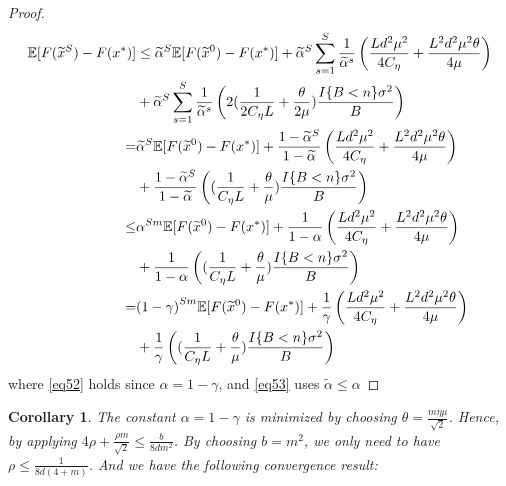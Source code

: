 \documentclass{article}
\newcommand*{\E}{\mathbb{E}}
\newtheorem{corollary}[theorem]{Corollary}
\theoremstyle{definition}
\theoremstyle{remark}
\begin{document}
{\begin{proof}
{\color{blue}
\begin{align}
\E[F(\widetilde{x}^S) - F(x^*)] & \leq \widetilde{\alpha}^{S} \E[F(\widetilde{x}^0) - F({x}^*)] +\widetilde{\alpha}^{S} \sum_{s=1}^S \frac{1}{\widetilde{\alpha}^s}\left(\frac{Ld^2\mu^2}{4C_{\eta}}+\frac{ L^2d^2\mu^2\theta}{4\mu}\right)\notag\\
&+\widetilde{\alpha}^{S} \sum_{s=1}^S \frac{1}{\widetilde{\alpha}^s}\left(2(\frac{1}{2C_{\eta} L}+\frac{\theta}{2\mu})\frac{I\{B < n\} \sigma ^2}{B}\right)\notag\\
 =& \widetilde{\alpha}^{S} \E[F(\widetilde{x}^0) - F(x^*)]+\frac{1-\widetilde{\alpha}^S}{1-\widetilde{\alpha}}\left(\frac{Ld^2\mu^2}{4C_{\eta}}+\frac{ L^2d^2\mu^2\theta}{4\mu}\right)\notag\\
&+ \frac{1-\widetilde{\alpha}^S}{1-\widetilde{\alpha}}\left((\frac{1}{C_{\eta} L}+\frac{\theta}{\mu})\frac{I\{B < n\} \sigma ^2}{B}\right)\notag\\
 \leq& {\alpha}^{Sm} \E[F(\widetilde{x}^0) - F(x^*)]+\frac{1}{1-{\alpha}}\left(\frac{Ld^2\mu^2}{4C_{\eta}}+\frac{ L^2d^2\mu^2\theta}{4\mu}\right)\notag\\
&+ \frac{1}{1-{\alpha}}\left((\frac{1}{C_{\eta} L}+\frac{\theta}{\mu})\frac{I\{B < n\} \sigma ^2}{B}\right)\\
 =& {(1-\gamma)}^{Sm} \E[F(\widetilde{x}^0) - F(x^*)]+\frac{1}{{\gamma}}\left(\frac{Ld^2\mu^2}{4C_{\eta}}+\frac{ L^2d^2\mu^2\theta}{4\mu}\right)\notag\\
&+ \frac{1}{\gamma}\left((\frac{1}{C_{\eta} L}+\frac{\theta}{\mu})\frac{I\{B < n\} \sigma ^2}{B}\right)
\end{align}
}
where \eqref{eq52} holds since $\alpha = 1-\gamma$, and \eqref{eq53} uses $\widetilde{\alpha} \leq \alpha$
\end{proof}
}
\begin{corollary}
 The constant $\alpha = 1-\gamma$ is minimized by choosing $\theta = \frac{m\eta\mu}{\sqrt{2}}$. Hence, by applying $ 4\rho+ \frac{\rho m}{\sqrt{2}}\leq \frac{b}{8dm^2}$. By choosing $b = m^2$, we only need to have $\rho \leq \frac{1}{8d(4+m)}$. And we have the following convergence result:
  
\end{corollary}
\end{document}
